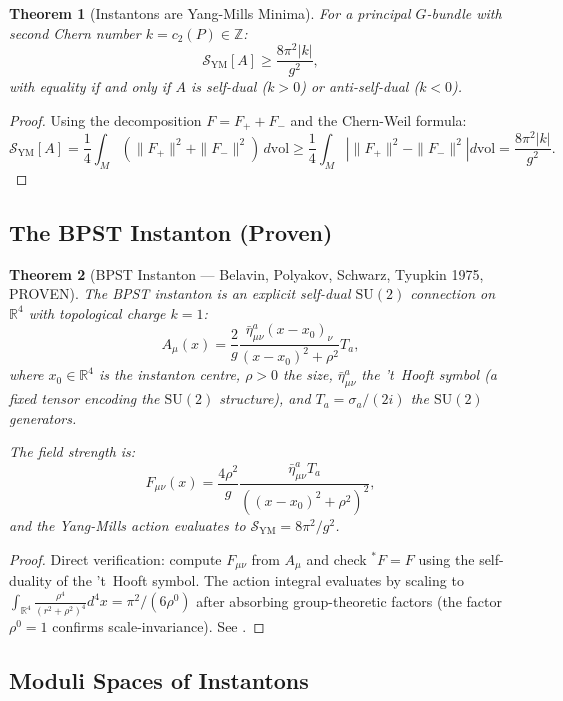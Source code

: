 \documentclass[12pt,a4paper]{amsart}
\newtheorem{theorem}{Theorem}[section]
\theoremstyle{definition}
\theoremstyle{remark}
\begin{document}
\begin{theorem}[Instantons are Yang-Mills Minima]
\label{thm:instanton-minimum}
For a principal $G$-bundle with second Chern number $k = c_2(P) \in \mathbb{Z}$:
\[
  \mathcal{S}_{\mathrm{YM}}[A] \geq \frac{8\pi^2 |k|}{g^2},
\]
with equality if and only if $A$ is self-dual ($k > 0$) or anti-self-dual ($k < 0$).
\end{theorem}

\begin{proof}
Using the decomposition $F = F_+ + F_-$ and the Chern-Weil formula:
\[
  \mathcal{S}_{\mathrm{YM}}[A] = \frac{1}{4} \int_M (\|F_+\|^2 + \|F_-\|^2) \, d\mathrm{vol}
  \geq \frac{1}{4} \int_M \left| \|F_+\|^2 - \|F_-\|^2 \right| d\mathrm{vol}
  = \frac{8\pi^2|k|}{g^2}.
\]
\end{proof}

\subsection{The BPST Instanton (Proven)}

\begin{theorem}[BPST Instanton — Belavin, Polyakov, Schwarz, Tyupkin 1975, PROVEN]
\label{thm:bpst}
The \emph{BPST instanton} is an explicit self-dual $\mathrm{SU}(2)$ connection on
$\mathbb{R}^4$ with topological charge $k = 1$:
\[
  A_\mu(x) = \frac{2}{g} \frac{\bar{\eta}^a_{\mu\nu} (x - x_0)_\nu}{(x - x_0)^2 + \rho^2} T_a,
\]
where $x_0 \in \mathbb{R}^4$ is the instanton centre, $\rho > 0$ the size,
$\bar{\eta}^a_{\mu\nu}$ the 't~Hooft symbol (a fixed tensor encoding the $\mathrm{SU}(2)$
structure), and $T_a = \sigma_a / (2i)$ the $\mathrm{SU}(2)$ generators.

The field strength is:
\[
  F_{\mu\nu}(x) = \frac{4\rho^2}{g} \frac{\bar{\eta}^a_{\mu\nu} T_a}{((x-x_0)^2 + \rho^2)^2},
\]
and the Yang-Mills action evaluates to $\mathcal{S}_{\mathrm{YM}} = 8\pi^2/g^2$.
\end{theorem}

\begin{proof}
Direct verification: compute $F_{\mu\nu}$ from $A_\mu$ and check ${}^* F = F$ using
the self-duality of the 't~Hooft symbol. The action integral evaluates by scaling
to $\int_{\mathbb{R}^4} \frac{\rho^4}{(r^2 + \rho^2)^4} d^4x = \pi^2/(6\rho^0)$
after absorbing group-theoretic factors (the factor $\rho^0 = 1$ confirms
scale-invariance). See \cite{BPST1975}.
\end{proof}

\subsection{Moduli Spaces of Instantons}
\end{document}
